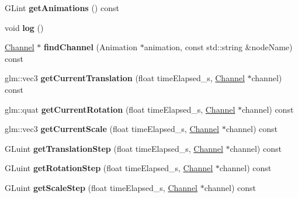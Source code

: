 \begin{DoxyCompactItemize}
G\+Lint {\bfseries get\+Animations} () const
\item 
\mbox{\label{classflw_1_1flf_1_1Animator_a24c60b9bc99325b4ae3e472fef9651c8}} 
void {\bfseries log} ()
\item 
\mbox{\label{classflw_1_1flf_1_1Animator_abfb995c00454cf92152b809e03e6a2fe}} 
\hyperlink{classflw_1_1flf_1_1Channel}{Channel} $\ast$ {\bfseries find\+Channel} (Animation $\ast$animation, const std\+::string \&node\+Name) const
\item 
\mbox{\label{classflw_1_1flf_1_1Animator_a4f40fb63f2622d9a8b9376e16b8b8fb6}} 
glm\+::vec3 {\bfseries get\+Current\+Translation} (float time\+Elapsed\+\_\+s, \hyperlink{classflw_1_1flf_1_1Channel}{Channel} $\ast$channel) const
\item 
\mbox{\label{classflw_1_1flf_1_1Animator_acc8ef6fe5e8a1486bcf79ac6098ff181}} 
glm\+::quat {\bfseries get\+Current\+Rotation} (float time\+Elapsed\+\_\+s, \hyperlink{classflw_1_1flf_1_1Channel}{Channel} $\ast$channel) const
\item 
\mbox{\label{classflw_1_1flf_1_1Animator_a25b51ebef8ed025c5f04122a0f034b63}} 
glm\+::vec3 {\bfseries get\+Current\+Scale} (float time\+Elapsed\+\_\+s, \hyperlink{classflw_1_1flf_1_1Channel}{Channel} $\ast$channel) const
\item 
\mbox{\label{classflw_1_1flf_1_1Animator_a19d2043817b6d925f314b0466c008519}} 
G\+Luint {\bfseries get\+Translation\+Step} (float time\+Elapsed\+\_\+s, \hyperlink{classflw_1_1flf_1_1Channel}{Channel} $\ast$channel) const
\item 
\mbox{\label{classflw_1_1flf_1_1Animator_a30942493332aeb6382e0375b65d56d1b}} 
G\+Luint {\bfseries get\+Rotation\+Step} (float time\+Elapsed\+\_\+s, \hyperlink{classflw_1_1flf_1_1Channel}{Channel} $\ast$channel) const
\item 
\mbox{\label{classflw_1_1flf_1_1Animator_a02bd58a652768b2c4ffa3c21f25fb5b7}} 
G\+Luint {\bfseries get\+Scale\+Step} (float time\+Elapsed\+\_\+s, \hyperlink{classflw_1_1flf_1_1Channel}{Channel} $\ast$channel) const

\end{DoxyCompactItemize}
